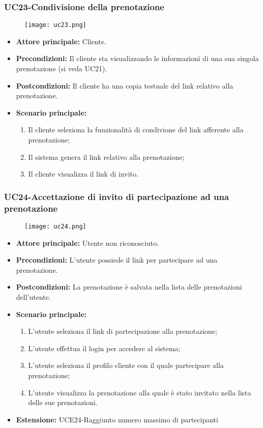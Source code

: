 \pagebreak
\subsubsection{UC23-Condivisione della prenotazione}
\begin{figure}[h] \texttt{[image: uc23.png]} \end{figure}
\begin{itemize}
    \item \textbf{Attore principale: } Cliente.
    \item \textbf{Precondizioni: }Il cliente sta visualizzando le informazioni di una sua singola prenotazione (si veda UC21).
    \item \textbf{Postcondizioni: }Il cliente ha una copia testuale del link relativo alla prenotazione.
    \item \textbf{Scenario principale:}
        \begin{enumerate}
            \item Il cliente seleziona la funzionalità di condivione del link afferente alla prenotazione;
            \item Il sistema genera il link relativo alla prenotazione;
            \item Il cliente visualizza il link di invito.
        \end{enumerate}
\end{itemize}

\subsubsection{UC24-Accettazione di invito di partecipazione ad una prenotazione}
\begin{figure}[h] \texttt{[image: uc24.png]} \end{figure}
\begin{itemize}
    \item \textbf{Attore principale: } Utente non riconosciuto.
    \item \textbf{Precondizioni: }L'utente possiede il link per partecipare ad una prenotazione.
    \item \textbf{Postcondizioni: }La prenotazione è salvata nella lista delle prenotazioni dell'utente.
    \item \textbf{Scenario principale:}
        \begin{enumerate}
            \item L'utente seleziona il link di partecipazione alla prenotazione;
            \item L'utente effettua il login per accedere al sistema;
            \item L'utente seleziona il profilo cliente con il quale partecipare alla prenotazione;
            \item L'utente visualizza la prenotazione alla quale è stato invitato nella lista delle sue
            prenotazioni.
        \end{enumerate}
        \item \textbf{Estensione: }UCE24-Raggiunto numero massimo di partecipanti
    \end{itemize}

